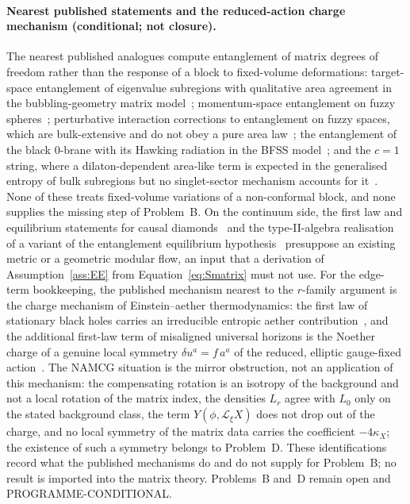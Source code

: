 \paragraph{Nearest published statements and the reduced-action charge mechanism (conditional; not closure).}
The nearest published analogues compute entanglement of matrix degrees of freedom rather than the response of a block to fixed-volume deformations: target-space entanglement of eigenvalue subregions with qualitative area agreement in the bubbling-geometry matrix model~\cite{TsuchiyaYamashiro2022}; momentum-space entanglement on fuzzy spheres~\cite{KawamotoKuroki2021}; perturbative interaction corrections to entanglement on fuzzy spaces, which are bulk-extensive and do not obey a pure area law~\cite{AlloucheDou2026}; the entanglement of the black 0-brane with its Hawking radiation in the BFSS model~\cite{ChoudhuryLaurenzano2024}; and the \(c=1\) string, where a dilaton-dependent area-like term is expected in the generalised entropy of bulk subregions but no singlet-sector mechanism accounts for it~\cite{Craps2026}. None of these treats fixed-volume variations of a non-conformal block, and none supplies the missing step of Problem~B. On the continuum side, the first law and equilibrium statements for causal diamonds~\cite{JacobsonVisser2019,Svesko2019} and the type-II-algebra realisation of a variant of the entanglement equilibrium hypothesis~\cite{JensenSorceSperanza2023} presuppose an existing metric or a geometric modular flow, an input that a derivation of Assumption~\ref{ass:EE} from Equation~\eqref{eq:Smatrix} must not use. For the edge-term bookkeeping, the published mechanism nearest to the \(r\)-family argument is the charge mechanism of Einstein--aether thermodynamics: the first law of stationary black holes carries an irreducible entropic aether contribution~\cite{ArataLiberatiNeri2026}, and the additional first-law term of misaligned universal horizons is the Noether charge of a genuine local symmetry \(\delta u^a=f\,a^a\) of the reduced, elliptic gauge-fixed action~\cite{ArataIsmailLiberati2026}. The NAMCG situation is the mirror obstruction, not an application of this mechanism: the compensating rotation is an isotropy of the background and not a local rotation of the matrix index, the densities \(L_r\) agree with \(L_0\) only on the stated background class, the term \(Y(\phi,\mathcal L_\xi X)\) does not drop out of the charge, and no local symmetry of the matrix data carries the coefficient \(-4\kappa_X\); the existence of such a symmetry belongs to Problem~D. These identifications record what the published mechanisms do and do not supply for Problem~B; no result is imported into the matrix theory. Problems~B and~D remain open and PROGRAMME-CONDITIONAL.
